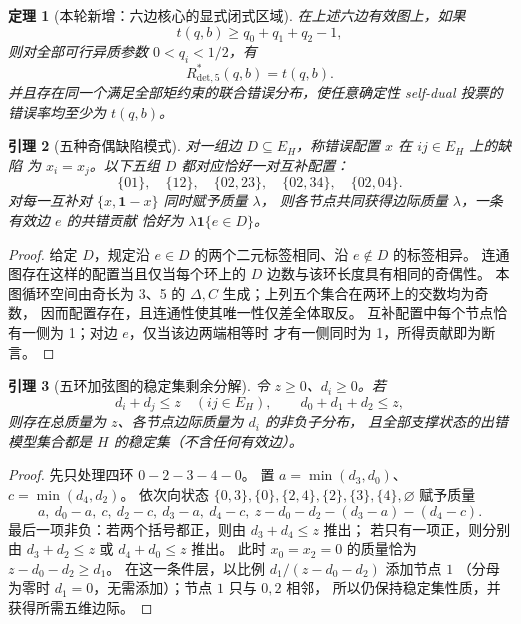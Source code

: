 \documentclass[11pt,a4paper]{ctexart}
\newtheorem{theorem}{定理}[section]
\newtheorem{lemma}[theorem]{引理}
\theoremstyle{remark}\newtheorem{remark}[theorem]{备注}
\newcommand{\Rstar}{R^*_{\mathrm{det},5}}
\newcommand{\bx}{\mathbf{1}}
\begin{document}
\begin{theorem}[本轮新增：六边核心的显式闭式区域]
在上述六边有效图上，如果
\begin{equation}\label{eq:triangle-condition}
\boxed{\displaystyle t(q,b)\ge q_0+q_1+q_2-1,}
\end{equation}
则对全部可行异质参数 $0<q_i<1/2$，有
\begin{equation}\label{eq:chord-closed}
\boxed{\displaystyle \Rstar(q,b)=t(q,b).}
\end{equation}
并且存在\emph{同一个}满足全部矩约束的联合错误分布，使任意确定性 self-dual
投票的错误率均至少为 $t(q,b)$。
\end{theorem}

\begin{lemma}[五种奇偶缺陷模式]
对一组边 $D\subseteq E_H$，称错误配置 $x$ 在 $ij\in E_H$ 上的\emph{缺陷}
为 $x_i=x_j$。以下五组 $D$ 都对应恰好一对互补配置：
\[
\{01\},\quad\{12\},\quad\{02,23\},\quad
\{02,34\},\quad\{02,04\}.
\]
对每一互补对 $\{x,\bx-x\}$ 同时赋予质量 $\lambda$，
则各节点共同获得边际质量 $\lambda$，一条有效边 $e$ 的共错贡献
恰好为 $\lambda\bx\{e\in D\}$。
\end{lemma}
\begin{proof}
给定 $D$，规定沿 $e\in D$ 的两个二元标签相同、沿 $e\notin D$ 的标签相异。
连通图存在这样的配置当且仅当每个环上的 $D$ 边数与该环长度具有相同的奇偶性。
本图循环空间由奇长为 3、5 的 $\Delta,C$ 生成；上列五个集合在两环上的交数均为奇数，
因而配置存在，且连通性使其唯一性仅差全体取反。
互补配置中每个节点恰有一侧为 1；对边 $e$，仅当该边两端相等时
才有一侧同时为 1，所得贡献即为断言。
\end{proof}

\begin{lemma}[五环加弦图的稳定集剩余分解]
令 $z\ge0$、$d_i\ge0$。若
\[
 d_i+d_j\le z\quad(ij\in E_H),\qquad d_0+d_1+d_2\le z,
\]
则存在总质量为 $z$、各节点边际质量为 $d_i$ 的非负子分布，
且全部支撑状态的出错模型集合都是 $H$ 的稳定集（不含任何有效边）。
\end{lemma}
\begin{proof}
先只处理四环 $0-2-3-4-0$。
置 $a=\min(d_3,d_0)$、$c=\min(d_4,d_2)$。
依次向状态 $\{0,3\},\{0\},\{2,4\},\{2\},\{3\},\{4\},\varnothing$
赋予质量
\[
a,\ d_0-a,\ c,\ d_2-c,\ d_3-a,\ d_4-c,\
z-d_0-d_2-(d_3-a)-(d_4-c).
\]
最后一项非负：若两个括号都正，则由 $d_3+d_4\le z$ 推出；
若只有一项正，则分别由 $d_3+d_2\le z$ 或 $d_4+d_0\le z$ 推出。
此时 $x_0=x_2=0$ 的质量恰为 $z-d_0-d_2\ge d_1$。
在这一条件层，以比例 $d_1/(z-d_0-d_2)$ 添加节点 $1$
（分母为零时 $d_1=0$，无需添加）；节点 $1$ 只与 $0,2$ 相邻，
所以仍保持稳定集性质，并获得所需五维边际。
\end{proof}
\end{document}
